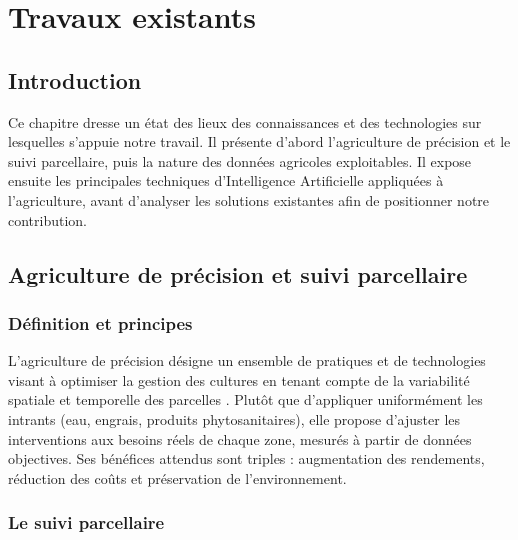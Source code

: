 \chapter{Travaux existants}
\label{chap:travaux}

\section*{Introduction}

Ce chapitre dresse un état des lieux des connaissances et des
technologies sur lesquelles s'appuie notre travail. Il présente
d'abord l'agriculture de précision et le suivi parcellaire, puis
la nature des données agricoles exploitables. Il expose ensuite
les principales techniques d'Intelligence Artificielle appliquées
à l'agriculture, avant d'analyser les solutions existantes afin
de positionner notre contribution.

\section{Agriculture de précision et suivi parcellaire}
\label{sec:agri_precision}

\subsection{Définition et principes}

L'agriculture de précision désigne un ensemble de pratiques et de
technologies visant à optimiser la gestion des cultures en tenant
compte de la variabilité spatiale et temporelle des parcelles
\cite{liakos2018machine}. Plutôt que d'appliquer uniformément les
intrants (eau, engrais, produits phytosanitaires), elle propose
d'ajuster les interventions aux besoins réels de chaque zone,
mesurés à partir de données objectives. Ses bénéfices attendus
sont triples : augmentation des rendements, réduction des coûts
et préservation de l'environnement.

\subsection{Le suivi parcellaire}

